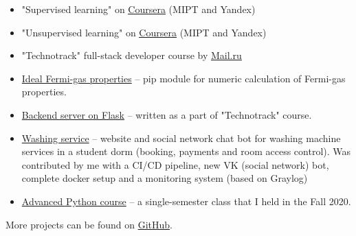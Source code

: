 
\begin{itemize}
	\item "Supervised learning" on \href{https://www.coursera.org/learn/supervised-learning?specialization=machine-learning-data-analysis}{\underline{Coursera}} (MIPT and Yandex)
	\item "Unsupervised learning" on \href{https://www.coursera.org/learn/unsupervised-learning?specialization=machine-learning-data-analysis}{\underline{Coursera}} (MIPT and Yandex)
	\item "Technotrack" full-stack developer course by \href{https://track.mail.ru/}{\underline{Mail.ru}}
\end{itemize}


\begin{itemize}
    \item \href{https://github.com/alekseik1/ifg-py}{Ideal Fermi-gas properties} -- pip module for numeric calculation of Fermi-gas properties.
    \item \href{https://github.com/alekseik1/tt-ridesharing-backend}{Backend server on Flask} -- written as a part of "Technotrack" course.
    \item \href{https://github.com/alekseik1/drec_stud_site}{Washing service} -- website and social network chat bot for washing machine services in a student dorm (booking, payments and room access control). Was contributed by me with a CI/CD pipeline, new VK (social network) bot, complete docker setup and a monitoring system (based on Graylog)
    \item \href{https://github.com/alekseik1/advanced_python_1sem_2020}{Advanced Python course} -- a single-semester class that I held in the Fall 2020.
\end{itemize}
More projects can be found on \href{https://github.com/alekseik1/}{GitHub}.

